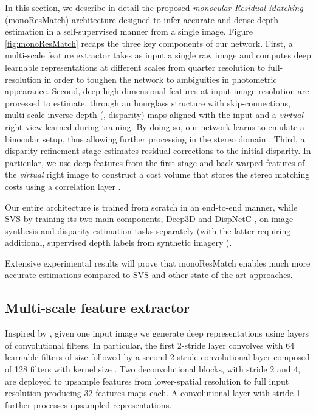 \documentclass[10pt,twocolumn,letterpaper]{article}
\begin{document}
In this section, we describe in detail the proposed \emph{monocular Residual Matching} (monoResMatch) architecture designed to infer accurate and dense depth estimation in a self-supervised manner from a single image. Figure \ref{fig:monoResMatch} recaps the three key components of our network. First, a multi-scale feature extractor takes as input a single raw image and computes deep learnable representations at different scales from quarter resolution  to full-resolution  in order to toughen the network to ambiguities in photometric appearance. Second, deep high-dimensional features at input image resolution are processed to estimate, through an hourglass structure with skip-connections, multi-scale inverse depth (\ie, disparity) maps aligned with the input and a \emph{virtual} right view learned during training. By doing so, our network learns to emulate a binocular setup, thus allowing further processing in the stereo domain \cite{luo2018single}.  
Third, a disparity refinement stage estimates residual corrections to the initial disparity. In particular, we use deep features from the first stage and back-warped features of the \emph{virtual} right image to construct a cost volume that stores the stereo matching costs using a correlation layer \cite{Mayer_2016_CVPR}.

Our entire architecture is trained from scratch in an end-to-end manner, while SVS \cite{luo2018single} by training its two main components, Deep3D \cite{xie2016deep3d} and DispNetC \cite{Mayer_2016_CVPR}, on image synthesis and disparity estimation tasks separately (with the latter requiring additional, supervised depth labels from synthetic imagery \cite{Mayer_2016_CVPR}).

Extensive experimental results will prove that monoResMatch enables much more accurate estimations compared to SVS and other state-of-the-art approaches.



\subsection{Multi-scale feature extractor}

Inspired by \cite{Liang_2018_CVPR}, given one input image  we generate deep representations using layers of convolutional filters. In particular, the first 2-stride layer convolves  with 64 learnable filters of size  followed by a second 2-stride convolutional layer composed of 128 filters with kernel size . Two deconvolutional blocks, with stride 2 and 4, are deployed to upsample features from lower-spatial resolution to full input resolution producing 32 features maps each. A  convolutional layer with stride 1 further processes upsampled representations.
\end{document}
